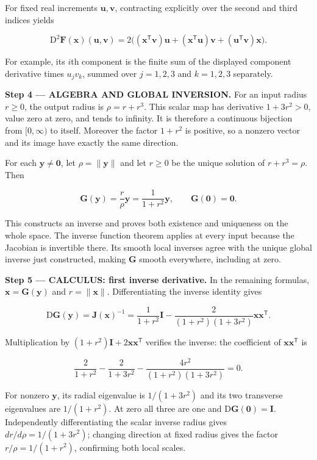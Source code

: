 \documentclass[11pt,oneside,openany]{book}
\begin{document}
For fixed real increments \(\mathbf u,\mathbf v\), contracting explicitly over the second and third indices yields

\[
\mathrm D^2\mathbf F(\mathbf x)(\mathbf u,\mathbf v)
=2\bigl((\mathbf x^{\mathsf T}\mathbf v)\mathbf u
+(\mathbf x^{\mathsf T}\mathbf u)\mathbf v
+(\mathbf u^{\mathsf T}\mathbf v)\mathbf x\bigr).
\]

For example, its \(i\)th component is the finite sum of the displayed component derivative times \(u_jv_k\), summed over \(j=1,2,3\) and \(k=1,2,3\) separately.

\begingroup\color{AlgebraBlue}
\textbf{Step 4 --- ALGEBRA AND GLOBAL INVERSION.} For an input radius \(r\ge0\), the output radius is \(\rho=r+r^3\). This scalar map has derivative \(1+3r^2>0\), value zero at zero, and tends to infinity. It is therefore a continuous bijection from \([0,\infty)\) to itself. Moreover the factor \(1+r^2\) is positive, so a nonzero vector and its image have exactly the same direction.

For each \(\mathbf y\ne\mathbf0\), let \(\rho=\|\mathbf y\|\) and let \(r\ge0\) be the unique solution of \(r+r^3=\rho\). Then

\[
\mathbf G(\mathbf y)=\frac{r}{\rho}\mathbf y
=\frac{1}{1+r^2}\mathbf y,\qquad \mathbf G(\mathbf0)=\mathbf0.
\]

This constructs an inverse and proves both existence and uniqueness on the whole space. The inverse function theorem applies at every input because the Jacobian is invertible there. Its smooth local inverses agree with the unique global inverse just constructed, making \(\mathbf G\) smooth everywhere, including at zero.

\endgroup
\textbf{Step 5 --- CALCULUS: first inverse derivative.} In the remaining formulas, \(\mathbf x=\mathbf G(\mathbf y)\) and \(r=\|\mathbf x\|\). Differentiating the inverse identity gives

\[
\mathrm D\mathbf G(\mathbf y)=\mathbf J(\mathbf x)^{-1}
=\frac{1}{1+r^2}\mathbf I
-\frac{2}{(1+r^2)(1+3r^2)}\mathbf x\mathbf x^{\mathsf T}.
\]

Multiplication by \((1+r^2)\mathbf I+2\mathbf x\mathbf x^{\mathsf T}\) verifies the inverse: the coefficient of \(\mathbf x\mathbf x^{\mathsf T}\) is

\[
\frac{2}{1+r^2}-\frac{2}{1+3r^2}
-\frac{4r^2}{(1+r^2)(1+3r^2)}=0.
\]

For nonzero \(\mathbf y\), its radial eigenvalue is \(1/(1+3r^2)\) and its two transverse eigenvalues are \(1/(1+r^2)\). At zero all three are one and \(\mathrm D\mathbf G(\mathbf0)=\mathbf I\). Independently differentiating the scalar inverse radius gives \(dr/d\rho=1/(1+3r^2)\); changing direction at fixed radius gives the factor \(r/\rho=1/(1+r^2)\), confirming both local scales.
\end{document}
